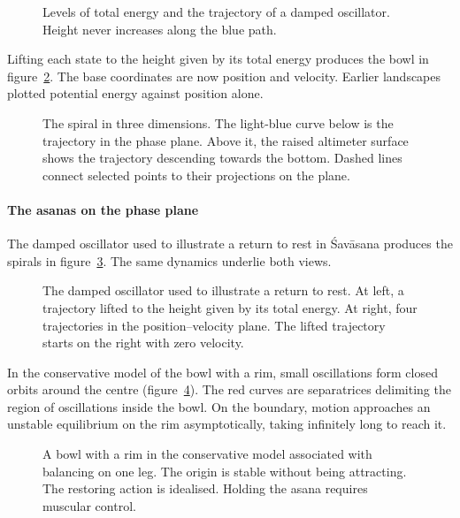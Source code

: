 \begin{figure}
\caption{Levels of total energy and the trajectory of a damped oscillator. Height never increases along the blue path.}
\label{fig:livelli}
\end{figure}

Lifting each state to the height given by its total energy produces the bowl in figure~\ref{fig:lyatre}. The base coordinates are now position and velocity. Earlier landscapes plotted potential energy against position alone.

\begin{figure}
\caption{The spiral in three dimensions. The light-blue curve below is the trajectory in the phase plane. Above it, the raised altimeter surface shows the trajectory descending towards the bottom. Dashed lines connect selected points to their projections on the plane.}
\label{fig:lyatre}
\end{figure}

\paragraph{The asanas on the phase plane} The damped oscillator used to illustrate a return to rest in Śavāsana produces the spirals in figure~\ref{fig:savasanatre}. The same dynamics underlie both views.

\begin{figure}
\caption{The damped oscillator used to illustrate a return to rest. At left, a trajectory lifted to the height given by its total energy. At right, four trajectories in the position--velocity plane. The lifted trajectory starts on the right with zero velocity.}
\label{fig:savasanatre}
\end{figure}

In the conservative model of the bowl with a rim, small oscillations form closed orbits around the centre (figure~\ref{fig:uhpfase}). The red curves are separatrices delimiting the region of oscillations inside the bowl. On the boundary, motion approaches an unstable equilibrium on the rim asymptotically, taking infinitely long to reach it.

\begin{figure}
\caption{A bowl with a rim in the conservative model associated with balancing on one leg. The origin is stable without being attracting. The restoring action is idealised. Holding the asana requires muscular control.}
\label{fig:uhpfase}
\end{figure}

